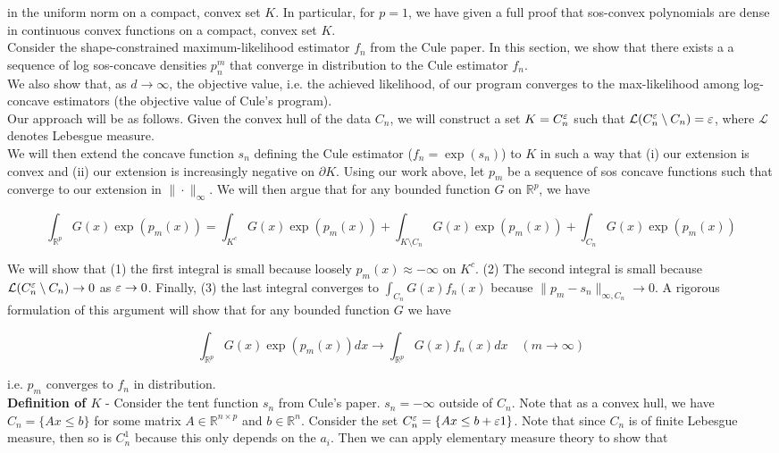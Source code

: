 \documentclass[11pt,reqno]{amsart}
\numberwithin{equation}{section}
\newcommand{\mr}{\mathbb{R}}
\newcommand{\tb}{\textbf}
\newcommand{\mc}{\mathcal}
\newcommand{\pa}{\partial}
\begin{document}
in the uniform norm on a compact, convex set $K$. In particular, for $p = 1$, we have given a full proof that sos-convex polynomials are dense in continuous convex functions on a compact, convex set $K$. \\

Consider the shape-constrained maximum-likelihood estimator $f_n$ from the Cule paper. In this section, we show that there exists a a sequence of log sos-concave densities $p_n^m$ that converge in distribution to the Cule estimator $f_n$. \\

We also show that, as $d \to \infty$, the objective value, i.e. the achieved likelihood, of our program converges to the max-likelihood among log-concave estimators (the objective value of Cule's program). \\

Our approach will be as follows. Given the convex hull of the data $C_n$, we will construct a set $K = C_n^{\varepsilon}$ such that $\mc{L}(C_n^{\eps} \setminus C_n) = \eps$, where $\mc{L}$ denotes Lebesgue measure. \\

We will then extend the concave function $s_n$ defining the Cule estimator ($f_n = \exp(s_n)$) to $K$ in such a way that (i) our extension is convex and (ii) our extension is increasingly negative on $\pa K$. Using our work above, let $p_m$ be a sequence of sos concave functions such that converge to our extension in $\| \cdot \|_{\infty}$. We will then argue that for any bounded function $G$ on $\mr^p$, we have 

\[
\int_{\mr^p} G(x) \exp(p_m(x)) = \int_{K^c} G(x) \exp(p_m(x)) + \int_{K \setminus C_n} G(x) \exp(p_m(x)) + \int_{C_n} G(x) \exp(p_m(x))
\]

We will show that (1) the first integral is small because loosely $p_m(x) \approx - \infty$ on $K^c$.  (2) The second integral is small because $\mc{L}(C_n^{\eps} \setminus C_n) \to 0$ as $\varepsilon \rightarrow 0$. Finally, (3) the last integral converges to $\int_{C_n} G(x) f_n(x)$ because $\|p_m - s_n\|_{\infty,C_n} \to 0$. A rigorous formulation of this argument will show that for any bounded function $G$ we have 

\[
\int_{\mr^p} G(x) \exp(p_m(x)) dx \to \int_{\mr^p} G(x) f_n(x) dx \quad (m \to \infty) 
\]

i.e. $p_m$ converges to $f_n$ in distribution. \\

\tb{Definition of $K$} - Consider the tent function $s_n$ from Cule's paper. $s_n = -\infty$ outside of $C_n$. Note that as a convex hull, we have $C_n = \{Ax \leq b\}$ for some matrix $A \in \mr^{n \times p}$ and $b \in \mr^n$. Consider the set $C_n^{\varepsilon} = \{Ax \leq b + \varepsilon 1\}$. Note that since $C_n$ is of finite Lebesgue measure, then so is $C_n^1$ because this only depends on the $a_i$. Then we can apply elementary measure theory to show that 
\end{document}
